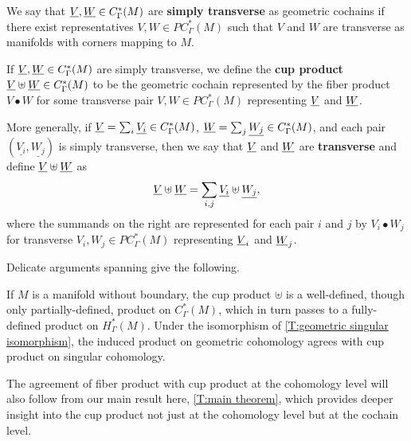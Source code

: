\begin{definition}\label{D:cochain trans}
	We say that $\underline{V}, \underline{W} \in C^*_{\Gamma}(M)$ are \textbf{simply transverse} as geometric cochains if there exist representatives $V,W \in PC^*_\Gamma(M)$ such that $V$ and $W$ are transverse as manifolds with corners mapping to $M$.

	If $\underline{V}, \underline{W} \in C^*_{\Gamma}(M)$ are simply transverse, we define the \textbf{cup product} $\underline{V} \uplus \underline{W} \in C^*_\Gamma(M)$ to be the geometric cochain represented by the fiber product $V \bullet W$ for some transverse pair $V,W \in PC^*_\Gamma(M)$ representing $\underline{V}$ and $\underline{W}$.

	More generally, if $\underline{V} = \sum_i \underline{V_i} \in C_\Gamma^*(M)$, $\underline{W} = \sum_j \underline{W_j} \in C_\Gamma^*(M)$, and each pair $(\underline{V_i},\underline{W_j})$ is simply transverse, then
	we say that $\underline{V}$ and $\underline{W}$ are \textbf{transverse} and define $\underline{V}\uplus\underline{W}$ as
	\[
	\underline{V}\uplus\underline{W} = \sum_{i,j} \underline{V_i}\uplus \underline{W_j},
	\]
	where the summands on the right are represented for each pair $i$ and $j$ by $V_i \bullet W_j$ for transverse $V_i, W_j \in PC^*_\Gamma(M)$ representing $\underline{V}_i$ and $\underline{W}_j$.
\end{definition}

Delicate arguments spanning \cite[Theorems 7.9, 7.14, 7.22, and 7.29]{medina2022foundations} give the following.

\begin{theorem}\label{P:product}
	If $M$ is a manifold without boundary, the cup product $\uplus$ is a well-defined, though only partially-defined, product on $C_\Gamma^*(M)$, which in turn passes to a fully-defined product on $H_\Gamma^*(M)$.
	Under the isomorphism of \cref{T:geometric singular isomorphism}, the induced product on geometric cohomology agrees with cup product on singular cohomology.
\end{theorem}

The agreement of fiber product with cup product at the cohomology level will also follow from our main result here, \cref{T:main theorem}, which provides deeper insight into the cup product not just at the cohomology level but at the cochain level.